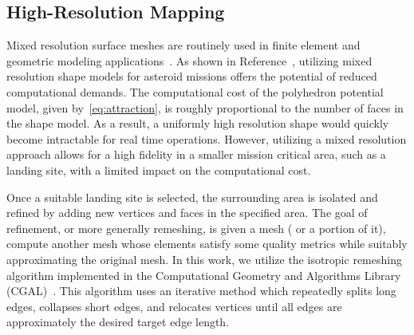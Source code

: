 \documentclass[journal]{new-aiaa}
\begin{document}
\subsection{High-Resolution Mapping}\label{sec:refinement}

Mixed resolution surface meshes are routinely used in finite element and geometric modeling applications~\cite{botsch2010}.
As shown in Reference~, utilizing mixed resolution shape models for asteroid missions offers the potential of reduced computational demands.
The computational cost of the polyhedron potential model, given by~\cref{eq:attraction}, is roughly proportional to the number of faces in the shape model.
As a result, a uniformly high resolution shape would quickly become intractable for real time operations.
However, utilizing a mixed resolution approach allows for a high fidelity in a smaller mission critical area, such as a landing site, with a limited impact on the computational cost.

Once a suitable landing site is selected, the surrounding area is isolated and refined by adding new vertices and faces in the specified area.
The goal of refinement, or more generally remeshing, is given a mesh ( or a portion of it), compute another mesh whose elements satisfy some quality metrics while suitably approximating the original mesh.
In this work, we utilize the isotropic remeshing algorithm implemented in the Computational Geometry and Algorithms Library (CGAL)~\cite{cgalproject2018}.
This algorithm uses an iterative method which repeatedly splits long edges, collapses short edges, and relocates vertices until all edges are approximately the desired target edge length.
\end{document}
